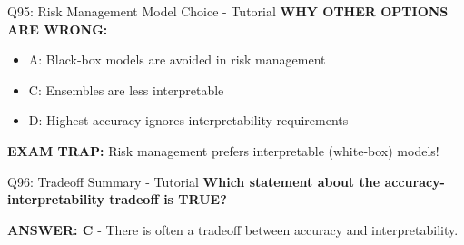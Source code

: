 \documentclass[8pt]{beamer}
\begin{document}
\begin{frame}{Q95: Risk Management Model Choice - Tutorial}
		\vspace{0.05cm}
		\textcolor{myred}{\textbf{WHY OTHER OPTIONS ARE WRONG:}}
		\begin{itemize}
			\item \textcolor{myred}{A:} Black-box models are avoided in risk management
			\item \textcolor{myred}{C:} Ensembles are less interpretable
			\item \textcolor{myred}{D:} Highest accuracy ignores interpretability requirements
		\end{itemize}
		
		\textcolor{myred}{\textbf{EXAM TRAP:}} Risk management prefers interpretable (white-box) models!
	\end{frame}
	
	\begin{frame}{Q96: Tradeoff Summary - Tutorial}
		\fontsize{6.5}{7.5}\selectfont
		\textbf{Which statement about the accuracy-interpretability tradeoff is TRUE?}
		
		\vspace{0.05cm}
		\textcolor{myblue}{\textbf{ANSWER: C}} - There is often a tradeoff between accuracy and interpretability.
		

\end{frame}
\end{document}
